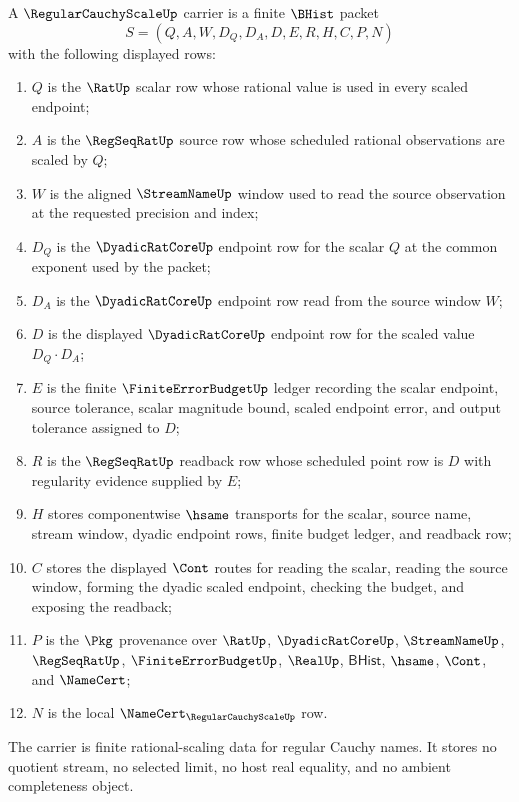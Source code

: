 \begin{definition}
\label{def:regular-cauchy-scale-carrier}
A $\RegularCauchyScaleUp$ carrier is a finite $\BHist$ packet
$$
S=(Q,A,W,D_Q,D_A,D,E,R,H,C,P,N)
$$
with the following displayed rows:
\begin{enumerate}
\item $Q$ is the $\RatUp$ scalar row whose rational value is used in every scaled endpoint;
\item $A$ is the $\RegSeqRatUp$ source row whose scheduled rational observations are scaled by $Q$;
\item $W$ is the aligned $\StreamNameUp$ window used to read the source observation at the requested precision and index;
\item $D_Q$ is the $\DyadicRatCoreUp$ endpoint row for the scalar $Q$ at the common exponent used by the packet;
\item $D_A$ is the $\DyadicRatCoreUp$ endpoint row read from the source window $W$;
\item $D$ is the displayed $\DyadicRatCoreUp$ endpoint row for the scaled value $D_Q \cdot D_A$;
\item $E$ is the finite $\FiniteErrorBudgetUp$ ledger recording the scalar endpoint, source tolerance, scalar magnitude bound, scaled endpoint error, and output tolerance assigned to $D$;
\item $R$ is the $\RegSeqRatUp$ readback row whose scheduled point row is $D$ with regularity evidence supplied by $E$;
\item $H$ stores componentwise $\hsame$ transports for the scalar, source name, stream window, dyadic endpoint rows, finite budget ledger, and readback row;
\item $C$ stores the displayed $\Cont$ routes for reading the scalar, reading the source window, forming the dyadic scaled endpoint, checking the budget, and exposing the readback;
\item $P$ is the $\Pkg$ provenance over $\RatUp$, $\DyadicRatCoreUp$, $\StreamNameUp$, $\RegSeqRatUp$, $\FiniteErrorBudgetUp$, $\RealUp$, $\mathsf{BHist}$, $\hsame$, $\Cont$, and $\NameCert$;
\item $N$ is the local $\NameCert_{\RegularCauchyScaleUp}$ row.
\end{enumerate}
The carrier is finite rational-scaling data for regular Cauchy names. It stores no quotient stream, no selected limit, no host real equality, and no ambient completeness object.
\end{definition}

